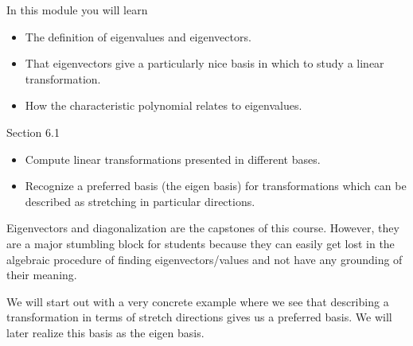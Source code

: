 \documentclass{problemset}
\begin{document}
\begin{module}

	In this module you will learn
	\begin{itemize}
		\item The definition of eigenvalues and eigenvectors.
		\item That eigenvectors give a particularly nice basis in which to study a linear transformation.
		\item How the characteristic polynomial relates to eigenvalues.
	\end{itemize}

	
\end{module}
\begin{lesson}

	Section 6.1

	\begin{itemize}
		\item Compute linear transformations presented in different bases.
		\item Recognize a preferred basis (the eigen basis) for transformations
			which can be described as stretching in particular directions.
	\end{itemize}

	Eigenvectors and diagonalization are the capstones of this course. However,
	they are a major stumbling block for students because they can easily get lost in
	the algebraic procedure of finding eigenvectors/values and not have any grounding
	of their meaning.

	We will start out with a very concrete example where we see that
	describing a transformation in terms of stretch directions gives us a preferred basis.
	We will later realize this basis as the eigen basis.

\end{lesson}
\end{document}
